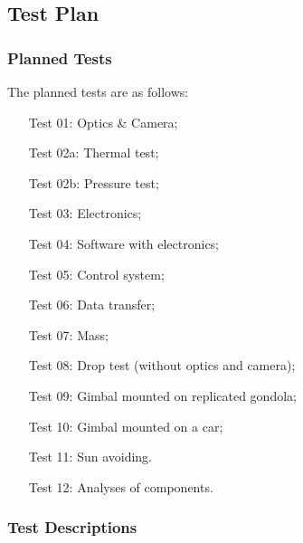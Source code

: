 
\pagebreak
\subsection{Test Plan}

\subsubsection{Planned Tests}
The planned tests are as follows:

\begin{enumerate}[leftmargin=2.1cm]
   \item[Test 01:] Optics \& Camera;
   \item[Test 02a:] Thermal test;
   \item[Test 02b:] Pressure test;
   \item[Test 03:] Electronics;
   \item[Test 04:] Software with electronics;
   \item[Test 05:] Control system;
   \item[Test 06:] Data transfer;
   \item[Test 07:] Mass;
   \item[Test 08:] Drop test (without optics and camera);
   \item[Test 09:] Gimbal mounted on replicated gondola;
   \item[Test 10:] Gimbal mounted on a car;
   \item[Test 11:] Sun avoiding.
   \item[Test 12:] Analyses of components.
\end{enumerate}

\subsubsection{Test Descriptions}












